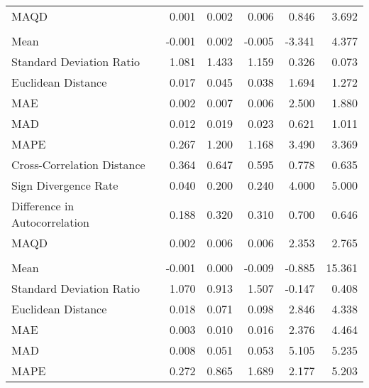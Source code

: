 \begin{landscape}
\begin{ThreePartTable}
\begin{longtable}[t]{lrrrrr}
\hspace{1em}MAQD & 0.001 & 0.002 & 0.006 & 0.846 & 3.692\\
\addlinespace[0.5em]
\multicolumn{6}{l}{\textbf{CHE}}\\
\hline
\hspace{1em}Mean & -0.001 & 0.002 & -0.005 & -3.341 & 4.377\\
\hspace{1em}Standard Deviation Ratio & 1.081 & 1.433 & 1.159 & 0.326 & 0.073\\
\hspace{1em}Euclidean Distance & 0.017 & 0.045 & 0.038 & 1.694 & 1.272\\
\hspace{1em}MAE & 0.002 & 0.007 & 0.006 & 2.500 & 1.880\\
\hspace{1em}MAD & 0.012 & 0.019 & 0.023 & 0.621 & 1.011\\
\hspace{1em}MAPE & 0.267 & 1.200 & 1.168 & 3.490 & 3.369\\
\hspace{1em}Cross-Correlation Distance & 0.364 & 0.647 & 0.595 & 0.778 & 0.635\\
\hspace{1em}Sign Divergence Rate & 0.040 & 0.200 & 0.240 & 4.000 & 5.000\\
\hspace{1em}Difference in Autocorrelation & 0.188 & 0.320 & 0.310 & 0.700 & 0.646\\
\hspace{1em}MAQD & 0.002 & 0.006 & 0.006 & 2.353 & 2.765\\
\addlinespace[0.5em]
\multicolumn{6}{l}{\textbf{CHL}}\\
\hline
\hspace{1em}Mean & -0.001 & 0.000 & -0.009 & -0.885 & 15.361\\
\hspace{1em}Standard Deviation Ratio & 1.070 & 0.913 & 1.507 & -0.147 & 0.408\\
\hspace{1em}Euclidean Distance & 0.018 & 0.071 & 0.098 & 2.846 & 4.338\\
\hspace{1em}MAE & 0.003 & 0.010 & 0.016 & 2.376 & 4.464\\
\hspace{1em}MAD & 0.008 & 0.051 & 0.053 & 5.105 & 5.235\\
\hspace{1em}MAPE & 0.272 & 0.865 & 1.689 & 2.177 & 5.203\\

\end{longtable}
\end{ThreePartTable}
\end{landscape}
